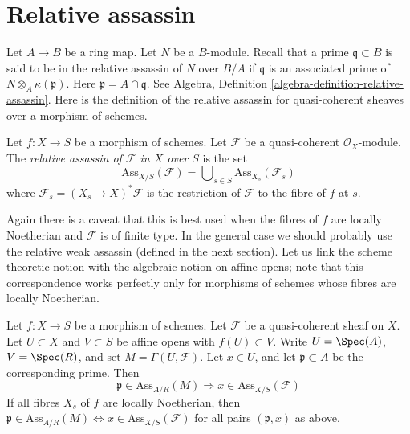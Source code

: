 \section{Relative assassin}
\label{section-relative-assassin}

\noindent
Let $A \to B$ be a ring map. Let $N$ be a $B$-module. Recall that
a prime $\mathfrak q \subset B$ is said to be in the relative assassin
of $N$ over $B/A$ if $\mathfrak q$ is an associated prime of
$N \otimes_A \kappa(\mathfrak p)$. Here $\mathfrak p = A \cap \mathfrak q$.
See Algebra, Definition \ref{algebra-definition-relative-assassin}.
Here is the definition of the relative assassin for quasi-coherent
sheaves over a morphism of schemes.

\begin{definition}
\label{definition-relative-assassin}
Let $f : X \to S$ be a morphism of schemes.
Let $\mathcal{F}$ be a quasi-coherent $\mathcal{O}_X$-module.
The {\it relative assassin of $\mathcal{F}$ in $X$ over $S$}
is the set
$$
\text{Ass}_{X/S}(\mathcal{F}) =
\bigcup\nolimits_{s \in S} \text{Ass}_{X_s}(\mathcal{F}_s)
$$
where $\mathcal{F}_s = (X_s \to X)^*\mathcal{F}$ is the restriction
of $\mathcal{F}$ to the fibre of $f$ at $s$.
\end{definition}

\noindent
Again there is a caveat that this is best used when the fibres of $f$
are locally Noetherian and $\mathcal{F}$ is of finite type. In the general
case we should probably use the relative weak assassin (defined in the next
section). Let us link the scheme theoretic notion with the algebraic notion
on affine opens; note that this correspondence works perfectly only
for morphisms of schemes whose fibres are locally Noetherian.

\begin{lemma}
\label{lemma-relative-assassin-affine-open}
Let $f : X \to S$ be a morphism of schemes.
Let $\mathcal{F}$ be a quasi-coherent sheaf on $X$.
Let $U \subset X$ and $V \subset S$ be affine opens
with $f(U) \subset V$. Write $U = \Spec(A)$, $V = \Spec(R)$, and set
$M = \Gamma(U, \mathcal{F})$.
Let $x \in U$, and let $\mathfrak p \subset A$ be the corresponding prime.
Then
$$
\mathfrak p \in \text{Ass}_{A/R}(M) \Rightarrow
x \in \text{Ass}_{X/S}(\mathcal{F})
$$
If all fibres $X_s$ of $f$ are locally Noetherian, then
$\mathfrak p \in \text{Ass}_{A/R}(M) \Leftrightarrow
x \in \text{Ass}_{X/S}(\mathcal{F})$
for all pairs $(\mathfrak p, x)$ as above.
\end{lemma}

